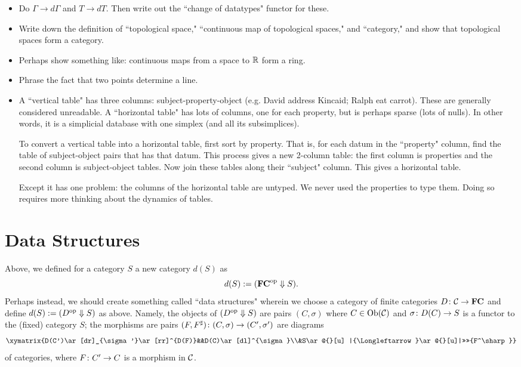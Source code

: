 \documentclass{amsart}
\makeatletter
\def\Down{\Downarrow}
\def\FC{{\bf FC}}
\newcommand{\TriLeft}[7]{\xymatrix{#1\ar[dr]_{#2}\ar[rr]^{#3}&&#4\ar[dl]^{#5}\\&#6\ar@{}[u] |{\Longleftarrow}\ar@{}[u]|>>>>{#7}}}
\makeatother
\begin{document}
\begin{itemize}

\item Do $\Gamma\to d\Gamma$ and $T\to dT$.  Then write out the ``change of datatypes" functor for these.
\item Write down the definition of  ``topological space,"  ``continuous map of topological spaces," and ``category,"  and show that topological spaces form a category.  
\item Perhaps show something like: continuous maps from a space to ${\mathbb R}$ form a ring. 
\item Phrase the fact that two points determine a line.
\item A ``vertical table" has three columns: subject-property-object (e.g. David address Kincaid; Ralph eat carrot).  These are generally considered unreadable.  A ``horizontal table" has lots of columns, one for each property, but is perhaps sparse (lots of nulls).  In other words, it is a simplicial database with one simplex (and all its subsimplices).  

To convert a vertical table into a horizontal table, first sort by property.  That is, for each datum in the ``property" column, find the table of subject-object pairs that has that datum.  This process gives a new 2-column table: the first column is properties and the second column is subject-object tables.  Now join these tables along their ``subject" column.  This gives a horizontal table.

Except it has one problem: the columns of the horizontal table are untyped.  We never used the properties to type them.  Doing so requires more thinking about the dynamics of tables.  

\end{itemize}

\section{Data Structures}

 Above, we defined for a category $S$ a new category $d(S)$ as $$d(S):=(\FC\op\Down S).$$  Perhaps instead, we should create something called ``data structures" wherein we choose a category of finite categories $D\taking\mcC\to\FC$ and define $d(S):=(D\op\Down S)$ as above.  Namely, the objects of $(D\op\Down S)$ are pairs $(C,\sigma)$ where $C\in\textnormal{Ob}(\mathcal{C})$ and $\sigma\colon D(C)\rightarrow S$ is a functor to the (fixed) category $S$; the morphisms are pairs $(F,F^\sharp)\colon (C,\sigma)\rightarrow(C',\sigma')$ are diagrams $$\TriLeft{D(C')}{\sigma'}{D(F)}{D(C)}{\sigma}{S}{F^\sharp}$$ of categories, where $F\colon C'\rightarrow C$ is a morphism in $\mathcal{C}$.
\end{document}
